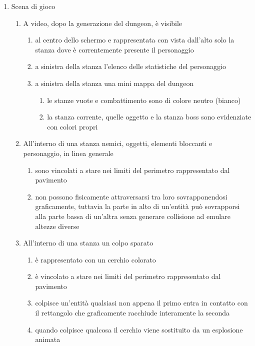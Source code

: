 \begin{enumerate}
    \item Scena di gioco
    \begin{enumerate}
        \item A video, dopo la generazione del dungeon, è visibile
        \begin{enumerate}
            \item al centro dello schermo e rappresentata con vista dall'alto solo la stanza dove è correntemente presente il personaggio
            \item a sinistra della stanza l'elenco delle statistiche del personaggio
            \item a sinistra della stanza una mini mappa del dungeon
            \begin{enumerate}
                \item le stanze vuote e combattimento sono di colore neutro (bianco)
                \item la stanza corrente, quelle oggetto e la stanza boss sono evidenziate con colori propri 
            \end{enumerate}
        \end{enumerate}
        \item All'interno di una stanza nemici, oggetti, elementi bloccanti e personaggio, in linea generale
            \begin{enumerate}
                \item sono vincolati a stare nei limiti del perimetro rappresentato dal pavimento
                \item non possono fisicamente attraversarsi tra loro sovrapponendosi graficamente, tuttavia la parte in alto di un'entità può sovrapporsi alla parte bassa di un'altra senza generare collisione ad emulare altezze diverse
            \end{enumerate}
        \item All'interno di una stanza un colpo sparato
        \begin{enumerate}
            \item è rappresentato con un cerchio colorato
            \item è vincolato a stare nei limiti del perimetro rappresentato dal pavimento
            \item colpisce un'entità qualsiasi non appena il primo entra in contatto con il rettangolo che graficamente racchiude interamente la seconda 
            \item quando colpisce qualcosa il cerchio viene sostituito da un esplosione animata
        \end{enumerate}
        

\end{enumerate}
\end{enumerate}
